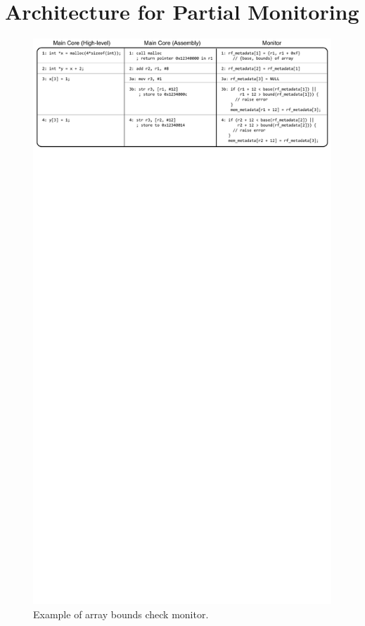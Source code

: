 \section{Architecture for Partial Monitoring}
\label{sec:monitoring_dift_drop.dropping}

\begin{figure}
  \begin{center}
    \includegraphics{monitoring_wcet/figs/example_full.pdf}
    \caption{Example of array bounds check monitor.}
    \label{fig:monitoring_dift_drop.dropping.example_full}
  \end{center}
\end{figure} 

